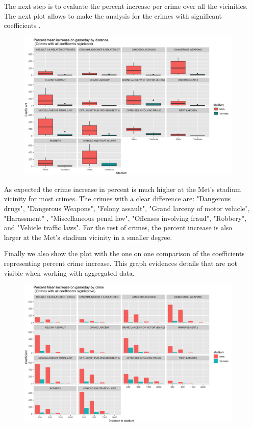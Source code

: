 \documentclass{article}
\begin{document}
The next step is to evaluate the percent increase per crime over all the vicinities. The next plot allows to make the analysis for the crimes with significant coefficients .

\begin{figure}[H]
\centering
\includegraphics[scale=0.45]{percent_all_boxes.png}
\end{figure}

As expected the crime increase in percent is much higher  at the Met's stadium vicinity for most crimes. The crimes with a  clear difference are: "Dangerous drugs", "Dangerous Weapons", "Felony assault", "Grand larceny  of motor vehicle", "Harassment" , "Miscellaneous penal law", "Offenses involving fraud", "Robbery", and "Vehicle traffic laws". For the rest of crimes, the  percent increase is also larger at the Met's stadium vicinity in a smaller degree.

Finally we also show the plot with the one on one comparison of the  coefficients representing percent crime increase. This graph evidences details that are not visible when working with aggregated data.


\begin{figure}[H]
\centering
\includegraphics[scale=0.45]{percent_bars.png}
\end{figure}
\end{document}
